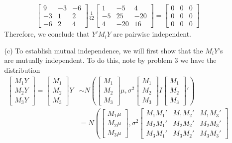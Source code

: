 \documentclass[11pt]{article}
\begin{document}
\begin{itemize}
\begin{itemize}
\begin{align*}
\begin{bmatrix}
9 & -3 & -6 \\
-3 & 1 & 2 \\
-6 & 2 & 4
\end{bmatrix}\frac{1}{42}\begin{bmatrix}
1 & -5 & 4 \\
-5 & 25 & -20 \\
4 & -20 & 16
\end{bmatrix} = \begin{bmatrix}
0 & 0 & 0 \\
0 & 0 & 0 \\
0 & 0 & 0
\end{bmatrix}
\end{align*}
Therefore, we conclude that $Y'M_iY$ are pairwise independent.
\item[(c)]  To establish mutual independence, we will first show that the $M_iY$'s are mutually independent.  To do this, note by problem 3 we have the distribution
\begin{align*}
\begin{bmatrix}
M_1Y \\ M_2Y \\ M_3Y
\end{bmatrix} = \begin{bmatrix}
M_1 \\ M_2 \\ M_3
\end{bmatrix}Y &\sim N\left(\begin{bmatrix}
M_1 \\ M_2 \\ M_3
\end{bmatrix}\mu, \sigma^2\begin{bmatrix}
M_1 \\ M_2 \\ M_3
\end{bmatrix} I \begin{bmatrix}
M_1 \\ M_2 \\ M_3
\end{bmatrix}'\right) \\
&= N\left(\begin{bmatrix}
M_1\mu \\ M_2\mu \\ M_3\mu 
\end{bmatrix}, \sigma^2\begin{bmatrix}
M_1M_1' & M_1M_2' & M_1M_3' \\
M_2M_1' & M_2M_2' & M_2M_3' \\
M_3M_1' & M_3M_2' & M_3M_3'

\end{bmatrix}
\end{align*}
\end{itemize}
\end{itemize}
\end{document}
